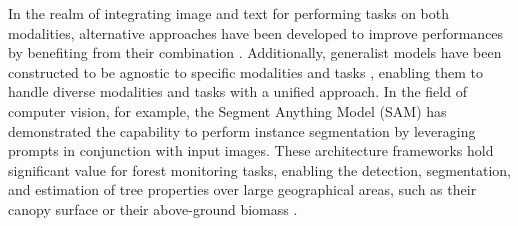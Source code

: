 \documentclass{CUP-JNL-DTM}%
\theoremstyle{definition}
\numberwithin{equation}{section}
\begin{document}
In the realm of integrating image and text for performing tasks on both modalities, alternative approaches have been developed to improve performances by benefiting from their combination \cite{zhu_uni-perceiver_2022, li_uni-perceiver_2023}.
Additionally, generalist models have been constructed to be agnostic to specific modalities and tasks \cite{jaegle_perceiver_2021, jaegle_perceiver_2022}, enabling them to handle diverse modalities and tasks with a unified approach.
%
In the field of computer vision, for example, the Segment Anything Model (SAM) \cite{kirillov_segment_2023} has demonstrated the capability to perform instance segmentation by leveraging prompts in conjunction with input images. 
These architecture frameworks hold significant value for forest monitoring tasks, enabling the detection, segmentation, and estimation of tree properties over large geographical areas, such as their canopy surface or their above-ground biomass \cite{tucker_sub-continental-scale_2023, tolan_sub-meter_2023}.
\end{document}
